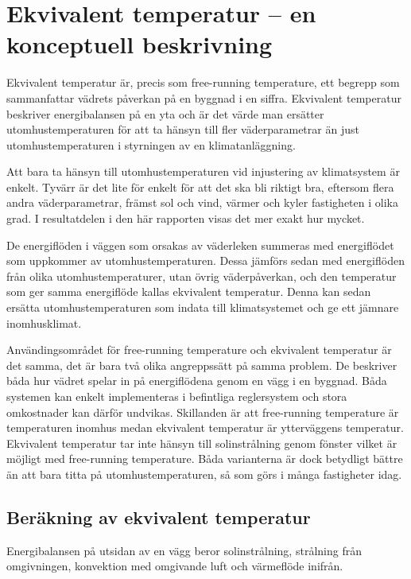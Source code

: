 
\section{Ekvivalent temperatur  – en konceptuell beskrivning}
\label{sec:ekv_temp}

Ekvivalent temperatur är, precis som free-running temperature, ett begrepp som sammanfattar vädrets påverkan på en byggnad i en siffra. Ekvivalent temperatur beskriver energibalansen på en yta och är det värde man ersätter utomhustemperaturen för att ta 
hänsyn till fler väderparametrar än just utomhustemperaturen i styrningen av en 
klimatanläggning.

Att bara ta hänsyn till utomhustemperaturen vid injustering av klimatsystem är enkelt. 
Tyvärr är det lite för enkelt för att det ska bli riktigt bra, eftersom flera andra 
väderparametrar, främst sol och vind, värmer och kyler fastigheten i olika grad. I resultatdelen i den här rapporten visas det mer exakt hur mycket.

De energiflöden i väggen som orsakas av väderleken summeras med energiflödet 
som uppkommer av utomhustemperaturen. Dessa jämförs sedan med energiflöden från 
olika utomhustemperaturer, utan övrig väderpåverkan, och den temperatur som ger 
samma energiflöde kallas ekvivalent temperatur. Denna kan sedan ersätta 
utomhustemperaturen som indata till klimatsystemet och ge ett jämnare inomhusklimat. 

Användingsområdet för free-running temperature och ekvivalent temperatur är det samma, det är bara två olika angreppssätt på samma problem. De beskriver båda hur vädret spelar in på energiflödena genom en vägg i en byggnad.  Båda systemen kan enkelt implementeras i befintliga reglersystem och stora omkostnader kan därför undvikas. Skillanden är att free-running temperature är temperaturen inomhus medan ekvivalent temperatur är ytterväggens temperatur. Ekvivalent temperatur tar inte hänsyn till solinstrålning genom fönster vilket är möjligt med free-running temperature. Båda varianterna är dock betydligt bättre än att bara titta på utomhustemperaturen, så som görs i många fastigheter idag.

\subsection{Beräkning av ekvivalent temperatur}

Energibalansen på utsidan av en vägg beror solinstrålning, strålning från omgivningen, konvektion med omgivande luft och värmeflöde inifrån.


